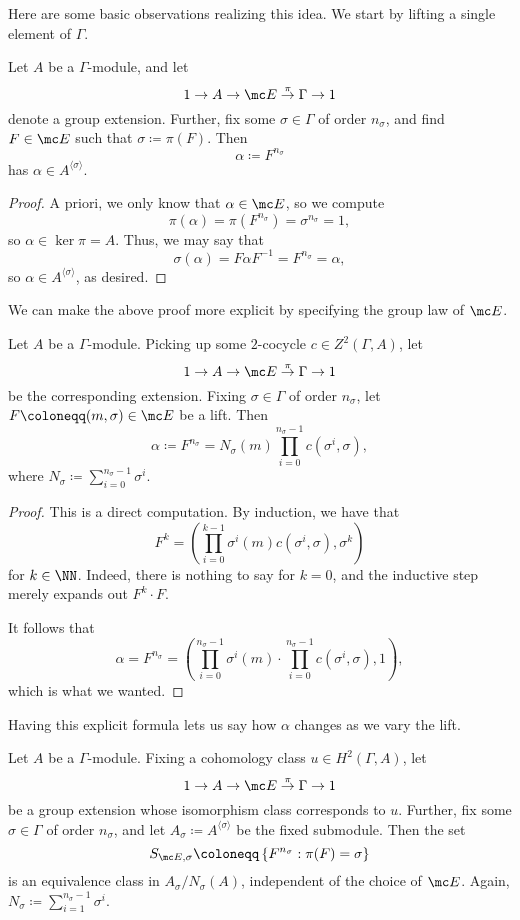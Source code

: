 \documentclass{article}
\numberwithin{equation}{section}
\begin{document}
Here are some basic observations realizing this idea. We start by lifting a single element of $\Gamma$.
\begin{lemma} \label{lem:constructalpha}
	Let $A$ be a $\Gamma$-module, and let 
	\[1\to A\to\mc E\stackrel\pi\to\Gamma\to1\]
	denote a group extension. Further, fix some $\sigma\in\Gamma$ of order $n_\sigma$, and find $F\in\mc E$ such that $\sigma\coloneqq\pi(F)$. Then
	\[\alpha\coloneqq F^{n_\sigma}\]
	has $\alpha\in A^{\langle\sigma\rangle}$.
\end{lemma}
\begin{proof}
	A priori, we only know that $\alpha\in\mc E$, so we compute
	\[\pi(\alpha)=\pi\left(F^{n_\sigma}\right)=\sigma^{n_\sigma}=1,\]
	so $\alpha\in\ker\pi=A$. Thus, we may say that
	\[\sigma(\alpha)=F\alpha F^{-1}=F^{n_\sigma}=\alpha,\]
	so $\alpha\in A^{\langle\sigma\rangle}$, as desired.
\end{proof}
We can make the above proof more explicit by specifying the group law of $\mc E$.
\begin{lemma} \label{lem:explicitalpha}
	Let $A$ be a $\Gamma$-module. Picking up some $2$-cocycle $c\in Z^2(\Gamma,A)$, let
	\[1\to A\to\mc E\stackrel\pi\to\Gamma\to1\]
	be the corresponding extension. Fixing $\sigma\in\Gamma$ of order $n_\sigma$, let $F\coloneqq(m,\sigma)\in\mc E$ be a lift. Then
	\[\alpha\coloneqq F^{n_\sigma}=N_\sigma(m)\prod_{i=0}^{n_\sigma-1}c\left(\sigma^i,\sigma\right),\]
	where $N_\sigma\coloneqq\sum_{i=0}^{n_\sigma-1}\sigma^i$.
\end{lemma}
\begin{proof}
	This is a direct computation. By induction, we have that
	\[F^k=\left(\prod_{i=0}^{k-1}\sigma^i(m)c\left(\sigma^i,\sigma\right),\sigma^k\right)\]
	for $k\in\NN$. Indeed, there is nothing to say for $k=0$, and the inductive step merely expands out $F^k\cdot F$.

	It follows that
	\[\alpha=F^{n_\sigma}=\left(\prod_{i=0}^{n_\sigma-1}\sigma^i(m)\cdot\prod_{i=0}^{n_\sigma-1}c\left(\sigma^i,\sigma\right),1\right),\]
	which is what we wanted.
\end{proof}
Having this explicit formula lets us say how $\alpha$ changes as we vary the lift.
\begin{prop} \label{prop:findallalpha}
	Let $A$ be a $\Gamma$-module. Fixing a cohomology class $u\in H^2(\Gamma,A)$, let 
	\[1\to A\to\mc E\stackrel\pi\to\Gamma\to1\]
	be a group extension whose isomorphism class corresponds to $u$. Further, fix some $\sigma\in\Gamma$ of order $n_\sigma$, and let $A_\sigma\coloneqq A^{\langle\sigma\rangle}$ be the fixed submodule. Then the set
	\[S_{\mc E,\sigma}\coloneqq\left\{F^{n_\sigma}:\pi(F)=\sigma\right\}\]
	is an equivalence class in $A_\sigma/N_\sigma(A)$, independent of the choice of $\mc E$. Again, $N_\sigma\coloneqq\sum_{i=1}^{n_\sigma-1}\sigma^i$.
\end{prop}
\end{document}
